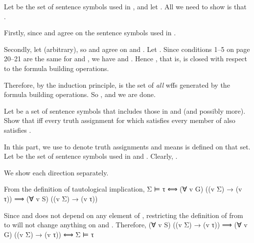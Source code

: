 					Let  be the set of sentence symbols used in , and let . All we need to show is that .

					Firstly,  since  and  agree on the sentence symbols used in .

					Secondly, let  (arbitrary), so  and  agree on  and . Let . Since conditions 1–5 on page 20–21 are the same for  and , we have  and . Hence , that is,  is closed with respect to the formula building operations.

					Therefore, by the induction principle,  is the set of \emph{all} wffs generated by the formula building operations. So , and we are done.
				\stopsolution
			
			\item  Let  be a set of sentence symbols that includes those in  and  (and possibly more). Show that  iff every truth assignment for  which satisfies every member of  also satisfies .

				\startsolution
					In this part, we use  to denote truth assignments and  means  is defined on that set. Let  be the set of sentence symbols used in  and . Clearly, .

					We show each direction separately.

					  \qquad
					From the definition of tautological implication,
					\startformula  \startalign[n=3]
						\NC     \NC  Σ ⊨ τ  \NR
						\NC  ⟺  \NC  (∀ v  G) ((v \text{ satisfies } Σ) → (v  τ))  \NR
						\NC  ⟹  \NC  (∀ v  S) ((v  Σ) → (v  τ))  \NC  \text{[Part (\in[uniqueness])]}  \NR
					\stopalign  \stopformula
					
					\bold{(\m{⟸})}  \qquad
					Since  and  does not depend on any element of , restricting the definition of  from  to  will not change anything on  and \m{τ}. Therefore,
					\startformula  \startalign
						\NC     \NC  (∀ v  S) ((v \text{ satisfies } Σ) → (v  τ))  \NR
						\NC  ⟹  \NC  (∀ v  G) ((v \text{ satisfies } Σ) → (v  τ))  \NR
						\NC  ⟺  \NC  Σ ⊨ τ  \NR
					\stopalign  \stopformula
				  
